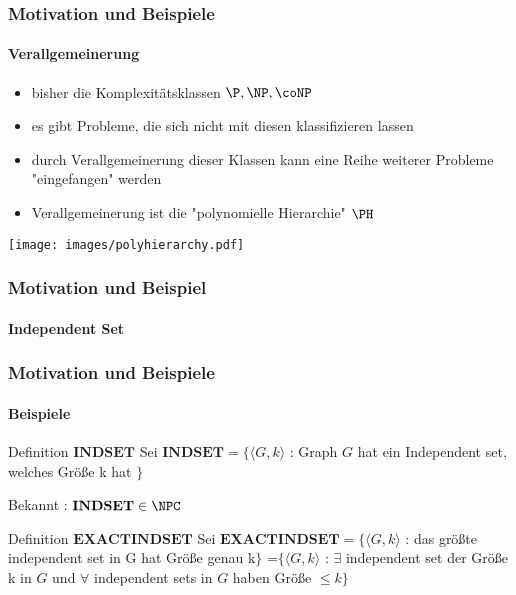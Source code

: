 \begin{frame}
		\frametitle{Motivation und Beispiele}
		\framesubtitle{Verallgemeinerung}
		
		\begin{itemize}[<+->]
			\item bisher die Komplexitätsklassen $\P, \NP , \coNP$
			\item es gibt Probleme, die sich nicht mit diesen klassifizieren lassen
			\item durch Verallgemeinerung dieser Klassen kann eine Reihe weiterer Probleme "eingefangen" werden
			\item Verallgemeinerung ist die "polynomielle Hierarchie" $\PH$ 
		\end{itemize}
		\pause
		\texttt{[image: images/polyhierarchy.pdf]}
\end{frame}
\begin{frame}
	\frametitle{Motivation und Beispiel}
	\framesubtitle{Independent Set}
\end{frame}
\begin{frame}
	\frametitle{Motivation und Beispiele}
	\framesubtitle{Beispiele}
	
	\begin{KITinfoblock}{Definition $\mathbf{INDSET}$}
	Sei $\mathbf{INDSET} = \lbrace \langle G,k \rangle $ : Graph $G$ hat ein
	Independent set, welches Größe k hat $\rbrace$
	\end{KITinfoblock}
	\bigskip
	\pause
	Bekannt : $\mathbf{INDSET} \in \NPC$
	\bigskip
	\pause
	\begin{KITinfoblock}{Definition $\mathbf{EXACT INDSET}$}
	Sei $\mathbf{EXACT INDSET} = \lbrace \langle G,k \rangle $ : das größte
	independent set in G hat Größe genau k$\rbrace$ \newline
	=$\lbrace \langle G,k \rangle$ : $\exists$ independent set der Größe k in $G$
	und $\forall$ independent sets in $G$ haben Größe $\leq k \rbrace$
	\end{KITinfoblock}
\end{frame}
